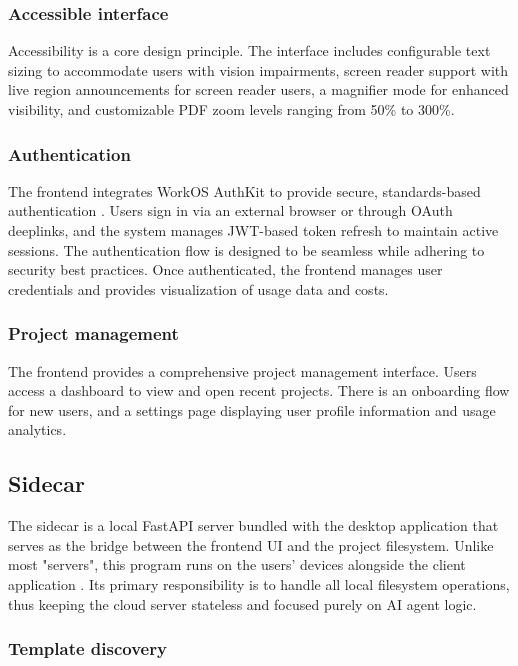 \subsubsection{Accessible interface}

Accessibility is a core design principle.
The interface includes configurable text sizing to accommodate users with vision impairments, screen reader support with live region announcements for screen reader users, a magnifier mode for enhanced visibility, and customizable PDF zoom levels ranging from 50\% to 300\%.

\subsubsection{Authentication}

The frontend integrates WorkOS AuthKit to provide secure, standards-based authentication \cite{workos}.
Users sign in via an external browser or through OAuth deeplinks, and the system manages JWT-based token refresh to maintain active sessions.
The authentication flow is designed to be seamless while adhering to security best practices.
Once authenticated, the frontend manages user credentials and provides visualization of usage data and costs.

\subsubsection{Project management}

The frontend provides a comprehensive project management interface.
Users access a dashboard to view and open recent projects.
There is an onboarding flow for new users, and a settings page displaying user profile information and usage analytics.

\subsection{Sidecar}

The sidecar is a local FastAPI server \cite{fastapi} bundled with the desktop application that serves as the bridge between the frontend UI and the project filesystem.
Unlike most "servers", this program runs on the users' devices alongside the client application \cite{tauri_sidecar}.
Its primary responsibility is to handle all local filesystem operations, thus keeping the cloud server stateless and focused purely on AI agent logic.

\subsubsection{Template discovery}

